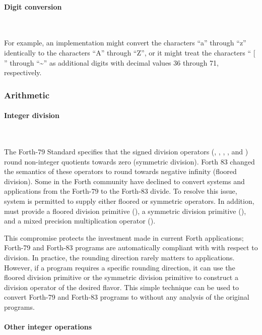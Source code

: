 \setcounter{paragraph}{1}
\paragraph{Digit conversion} ~ %

For example, an implementation might convert the characters ``a''
through ``z'' identically to the characters ``A'' through ``Z'', or
it might treat the characters `` [ '' through ``\~{}'' as additional
digits with decimal values 36 through 71, respectively.


\subsubsection{Arithmetic} %

\paragraph{Integer division} ~ %

The Forth-79 Standard specifies that the signed division operators
(\word{/}, , , , and \word{*/})
round non-integer quotients towards zero (symmetric division).
Forth 83 changed the semantics of these operators to round towards
negative infinity (floored division). Some in the Forth community
have declined to convert systems and applications from the Forth-79
to the Forth-83 divide.  To resolve this issue,  system
is permitted to supply either floored or symmetric operators. In
addition,  must provide a floored division primitive
(), a symmetric division primitive (), and
a mixed precision multiplication operator ().

This compromise protects the investment made in current Forth
applications; Forth-79 and Forth-83 programs are automatically
compliant with  with respect to division. In practice, the
rounding direction rarely matters to applications. However, if a
program requires a specific rounding direction, it can use the
floored division primitive  or the symmetric division
primitive  to construct a division operator of the
desired flavor. This simple technique can be used to convert Forth-79
and Forth-83 programs to  without any analysis of the
original programs.

\paragraph{Other integer operations} ~ %

